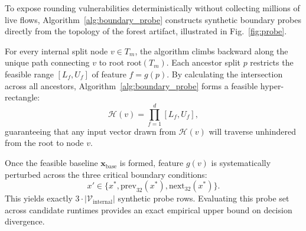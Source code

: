 To expose rounding vulnerabilities deterministically without collecting millions of live flows, Algorithm~\ref{alg:boundary_probe} constructs synthetic boundary probes directly from the topology of the forest artifact, illustrated in Fig.~\ref{fig:probe}.

For every internal split node $v \in T_m$, the algorithm climbs backward along the unique path connecting $v$ to root $\text{root}(T_m)$. Each ancestor split $p$ restricts the feasible range $[L_f, U_f]$ of feature $f = g(p)$. By calculating the intersection across all ancestors, Algorithm~\ref{alg:boundary_probe} forms a feasible hyper-rectangle:
\begin{equation}
\mathcal{H}(v) = \prod_{f=1}^d [L_f, U_f],
\end{equation}
guaranteeing that any input vector drawn from $\mathcal{H}(v)$ will traverse unhindered from the root to node $v$. 

Once the feasible baseline $\mathbf{x}_{\text{base}}$ is formed, feature $g(v)$ is systematically perturbed across the three critical boundary conditions:
\begin{equation}
x' \in \{ x^*, \text{prev}_{32}(x^*), \text{next}_{32}(x^*) \}.
\end{equation}
This yields exactly $3 \cdot |\mathcal{V}_{\text{internal}}|$ synthetic probe rows. Evaluating this probe set across candidate runtimes provides an exact empirical upper bound on decision divergence.

